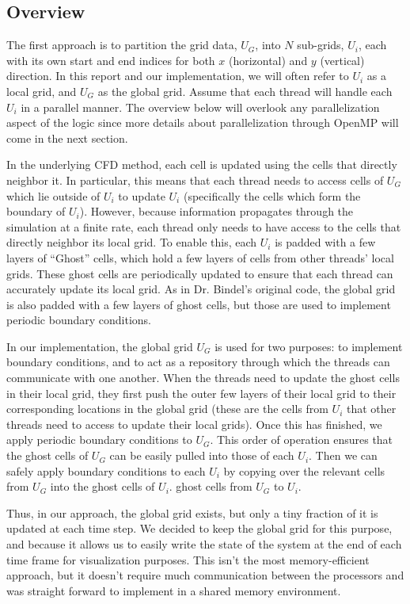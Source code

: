 \documentclass{article}
\begin{document}
\subsection{Overview}
The first approach is to partition the grid data, $U_G$, into $N$ sub-grids, $U_i$, each with its own start and end indices for both $x$ (horizontal) and $y$ (vertical) direction. In this report and our implementation, we will often refer to $U_i$ as a local grid, and $U_G$ as the global grid. Assume that each thread will handle each $U_i$ in a parallel manner. The overview below will overlook any parallelization aspect of the logic since more details about parallelization through OpenMP will come in the next section.

In the underlying CFD method, each cell is updated using the cells that directly neighbor it. In particular, this means that each thread needs to access cells of $U_G$ which lie outside of $U_i$ to update $U_i$ (specifically the cells which form the boundary of $U_i$). However, because information propagates through the simulation at a finite rate, each thread only needs to have access to the cells that directly neighbor its local grid. To enable this, each $U_i$ is padded with a few layers of ``Ghost'' cells, which hold a few layers of cells from other threads' local grids. These ghost cells are periodically updated to ensure that each thread can accurately update its local grid. As in Dr. Bindel's original code, the global grid is also padded with a few layers of ghost cells, but those are used to implement periodic boundary conditions.

In our implementation, the global grid $U_G$ is used for two purposes: to implement boundary conditions, and to act as a repository through which the threads can communicate with one another. When the threads need to update the ghost cells in their local grid, they first push the outer few layers of their local grid to their corresponding locations in the global grid (these are the cells from $U_i$ that other threads need to access to update their local grids). Once this has finished, we apply periodic boundary conditions to $U_G$. This order of operation ensures that the ghost cells of $U_G$ can be easily pulled into those of each $U_i$. Then we can safely apply boundary conditions to each $U_i$ by copying over the relevant cells from $U_G$ into the ghost cells of $U_i$. ghost cells from $U_G$ to $U_i$.

Thus, in our approach, the global grid exists, but only a tiny fraction of it is updated at each time step.  We decided to keep the global grid for this purpose, and because it allows us to easily write the state of the system at the end of each time frame for visualization purposes. This isn't the most memory-efficient approach, but it doesn't require much communication between the processors and was straight forward to implement in a shared memory environment.
\end{document}
